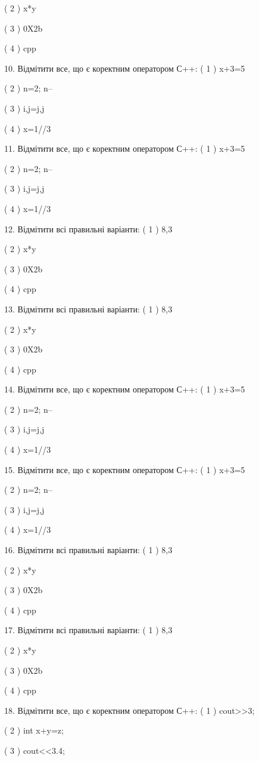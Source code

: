\documentclass[11pt]{article}
\begin{document}
( 2 ) x*y

( 3 ) 0X2b

( 4 ) cpp

10. Відмітити все, що є коректним оператором С++:
( 1 ) x+3=5

( 2 ) n=2; n--

( 3 ) i,j=j,j

( 4 ) x=1//3

11. Відмітити все, що є коректним оператором С++:
( 1 ) x+3=5

( 2 ) n=2; n--

( 3 ) i,j=j,j

( 4 ) x=1//3

12. Відмітити всі правильні варіанти:
( 1 ) 8,3

( 2 ) x*y

( 3 ) 0X2b

( 4 ) cpp

13. Відмітити всі правильні варіанти:
( 1 ) 8,3

( 2 ) x*y

( 3 ) 0X2b

( 4 ) cpp

14. Відмітити все, що є коректним оператором С++:
( 1 ) x+3=5

( 2 ) n=2; n--

( 3 ) i,j=j,j

( 4 ) x=1//3

15. Відмітити все, що є коректним оператором С++:
( 1 ) x+3=5

( 2 ) n=2; n--

( 3 ) i,j=j,j

( 4 ) x=1//3

16. Відмітити всі правильні варіанти:
( 1 ) 8,3

( 2 ) x*y

( 3 ) 0X2b

( 4 ) cpp

17. Відмітити всі правильні варіанти:
( 1 ) 8,3

( 2 ) x*y

( 3 ) 0X2b

( 4 ) cpp

18. Відмітити все, що є коректним оператором С++:
( 1 ) cout>>3;

( 2 ) int x+y=z;

( 3 ) cout<<3.4;
\end{document}

